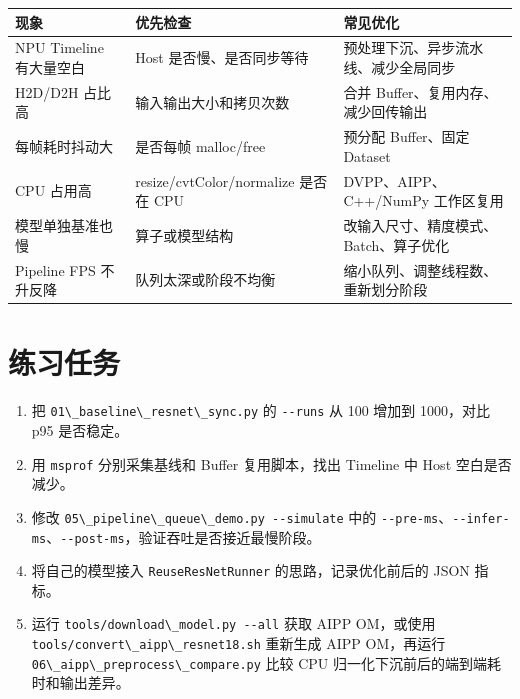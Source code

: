 \begin{longtable}[]{@{}
  >{\raggedright\arraybackslash}p{}
  >{\raggedright\arraybackslash}p{}
  >{\raggedright\arraybackslash}p{}@{}}
\toprule\noalign{}
\begin{minipage}[b]{\linewidth}\raggedright
现象
\end{minipage} & \begin{minipage}[b]{\linewidth}\raggedright
优先检查
\end{minipage} & \begin{minipage}[b]{\linewidth}\raggedright
常见优化
\end{minipage} \\
\midrule\noalign{}
\endhead
\bottomrule\noalign{}
\endlastfoot
NPU Timeline 有大量空白 & Host 是否慢、是否同步等待 &
预处理下沉、异步流水线、减少全局同步 \\
H2D/D2H 占比高 & 输入输出大小和拷贝次数 & 合并
Buffer、复用内存、减少回传输出 \\
每帧耗时抖动大 & 是否每帧 malloc/free & 预分配 Buffer、固定 Dataset \\
CPU 占用高 & resize/cvtColor/normalize 是否在 CPU &
DVPP、AIPP、C++/NumPy 工作区复用 \\
模型单独基准也慢 & 算子或模型结构 &
改输入尺寸、精度模式、Batch、算子优化 \\
Pipeline FPS 不升反降 & 队列太深或阶段不均衡 &
缩小队列、调整线程数、重新划分阶段 \\
\end{longtable}

\section{练习任务}\label{src-book-chapter8-h17}

\begin{enumerate}
\def\labelenumi{\arabic{enumi}.}
\tightlist
\item
  把 \passthrough{\lstinline!01\_baseline\_resnet\_sync.py!} 的
  \passthrough{\lstinline!--runs!} 从 100 增加到 1000，对比 p95
  是否稳定。
\item
  用 \passthrough{\lstinline!msprof!} 分别采集基线和 Buffer
  复用脚本，找出 Timeline 中 Host 空白是否减少。
\item
  修改 \passthrough{\lstinline!05\_pipeline\_queue\_demo.py --simulate!}
  中的
  \passthrough{\lstinline!--pre-ms!}、\passthrough{\lstinline!--infer-ms!}、\passthrough{\lstinline!--post-ms!}，验证吞吐是否接近最慢阶段。
\item
  将自己的模型接入 \passthrough{\lstinline!ReuseResNetRunner!}
  的思路，记录优化前后的 JSON 指标。
\item
  运行 \passthrough{\lstinline!tools/download\_model.py --all!} 获取
  AIPP OM，或使用
  \passthrough{\lstinline!tools/convert\_aipp\_resnet18.sh!} 重新生成
  AIPP OM，再运行
  \passthrough{\lstinline!06\_aipp\_preprocess\_compare.py!} 比较 CPU
  归一化下沉前后的端到端耗时和输出差异。
\end{enumerate}

